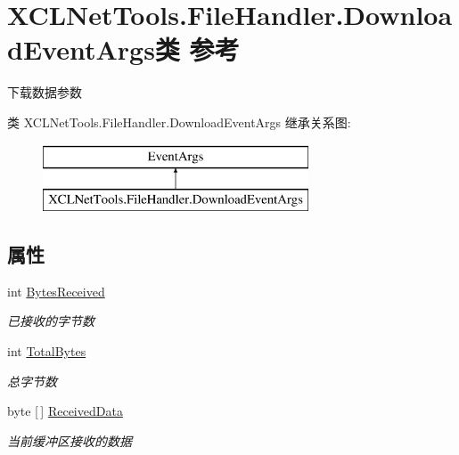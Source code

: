 \hypertarget{class_x_c_l_net_tools_1_1_file_handler_1_1_download_event_args}{}\section{X\+C\+L\+Net\+Tools.\+File\+Handler.\+Download\+Event\+Args类 参考}
\label{class_x_c_l_net_tools_1_1_file_handler_1_1_download_event_args}


下载数据参数  


类 X\+C\+L\+Net\+Tools.\+File\+Handler.\+Download\+Event\+Args 继承关系图\+:\begin{figure}[H]
\begin{center}
\leavevmode
\includegraphics[height=2.000000cm]{class_x_c_l_net_tools_1_1_file_handler_1_1_download_event_args}
\end{center}
\end{figure}
\subsection*{属性}
\begin{DoxyCompactItemize}
\item 
int \hyperlink{class_x_c_l_net_tools_1_1_file_handler_1_1_download_event_args_a1ea772d1ec4b2e0f1f3001fe069bac42}{Bytes\+Received}
\begin{DoxyCompactList}\small\item\em 已接收的字节数 \end{DoxyCompactList}\item 
int \hyperlink{class_x_c_l_net_tools_1_1_file_handler_1_1_download_event_args_a344cbcca5a213a50ecd25b90340be816}{Total\+Bytes}
\begin{DoxyCompactList}\small\item\em 总字节数 \end{DoxyCompactList}\item 
byte \mbox{[}$\,$\mbox{]} \hyperlink{class_x_c_l_net_tools_1_1_file_handler_1_1_download_event_args_ae080073b3629650c3befb398e9d7c2e8}{Received\+Data}
\begin{DoxyCompactList}\small\item\em 当前缓冲区接收的数据 \end{DoxyCompactList}\end{DoxyCompactItemize}


